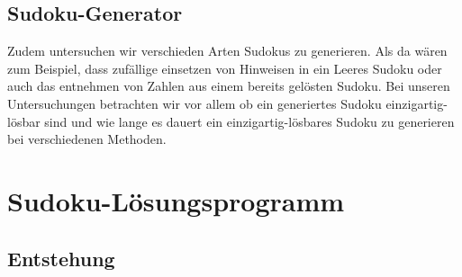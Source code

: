 \documentclass[11pt,a4paper]{article}
\begin{document}
\subsection{Sudoku-Generator}
Zudem untersuchen wir verschieden Arten Sudokus zu generieren. Als da wären zum Beispiel, dass zufällige einsetzen von Hinweisen in ein Leeres Sudoku oder auch das entnehmen von Zahlen aus einem bereits gelösten Sudoku. Bei unseren Untersuchungen betrachten wir vor allem ob ein generiertes Sudoku einzigartig-lösbar sind und wie lange es dauert ein einzigartig-lösbares Sudoku zu generieren bei verschiedenen Methoden.
\newpage

\section{Sudoku-Lösungsprogramm}

\subsection{Entstehung}
\end{document}
